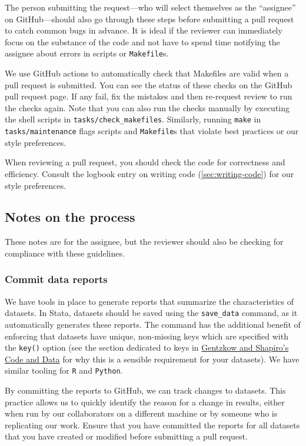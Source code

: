 The person submitting the request---who
will select themselves as the ``assignee'' on GitHub---should
also go through these steps before submitting a pull request
to catch common bugs in advance.
It is ideal if the reviewer can immediately focus on the substance of the code
and not have to spend time notifying the assignee about errors in scripts or \texttt{Makefile}s.

We use GitHub actions to automatically check
that Makefiles are valid when a pull request is submitted.
You can see the status of these checks on the GitHub pull request page.
If any fail,
fix the mistakes and then re-request review to run the checks again.
Note that you can also run the checks manually by executing the shell
scripts in \texttt{tasks/check\_makefiles}.
Similarly, running \texttt{make} in \texttt{tasks/maintenance} flags scripts and \texttt{Makefile}s that
violate best practices or our style preferences.

When reviewing a pull request,
you should check the code for correctness and efficiency.
Consult the logbook entry on writing code (\ref{sec:writing-code}) for our style preferences.

\subsection{Notes on the process}
These notes are for the assignee,
but the reviewer should also be checking for compliance with these guidelines.

\subsubsection{Commit data reports}
We have tools in place to generate reports that summarize the characteristics of datasets.
In Stata, datasets should be saved using the \texttt{save\_data} command,
as it automatically generates these reports.
The command has the additional benefit of enforcing that datasets have unique,
non-missing keys which are specified with the \texttt{key()} option
 (see the section dedicated to keys in \href{https://web.stanford.edu/~gentzkow/research/CodeAndData.pdf}{Gentzkow and Shapiro's Code and Data} for why this is a sensible requirement for your datasets).
We have similar tooling for \texttt{R} and \texttt{Python}.

By committing the reports to GitHub, we can track changes to datasets.
This practice allows us to quickly identify the reason for a change in results,
either when run by our collaborators on a different machine or by someone
who is replicating our work.
Ensure that you have committed the reports for all datasets
that you have created or modified before submitting a pull request.

